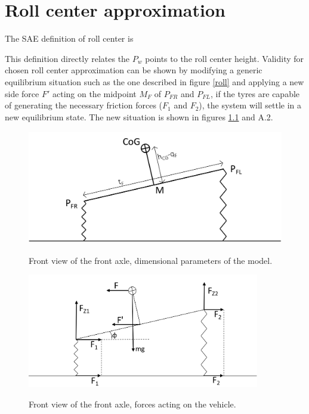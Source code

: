 \chapter{Roll center approximation}
\label{chap:roll}

The SAE definition of roll center is

\textit{}

This definition directly relates the $P_w$ points to the roll center height.
Validity for chosen roll center approximation can be shown by modifying a generic equilibrium situation such as the one described in figure \ref{roll} and applying a new side force $F'$ acting on the midpoint $M_F$ of $P_{FR}$ and $P_{FL}$, if the tyres are capable of generating the necessary friction forces ($F_1$ and $F_2$), the system will settle in a new equilibrium state.
The new situation is shown in figures \ref{rollforces} and A.2.

\begin{figure}[hbt]
  \centering
  \includegraphics[height = 5cm]{images/rollsizes}
  \label{rollsizes}
  \caption{Front view of the front axle, dimensional parameters of the model.}

  \centering
  \includegraphics[height = 5cm]{images/rollforces}
  \label{rollforces}
  \caption{Front view of the front axle, forces acting on the vehicle.}

\end{figure}

